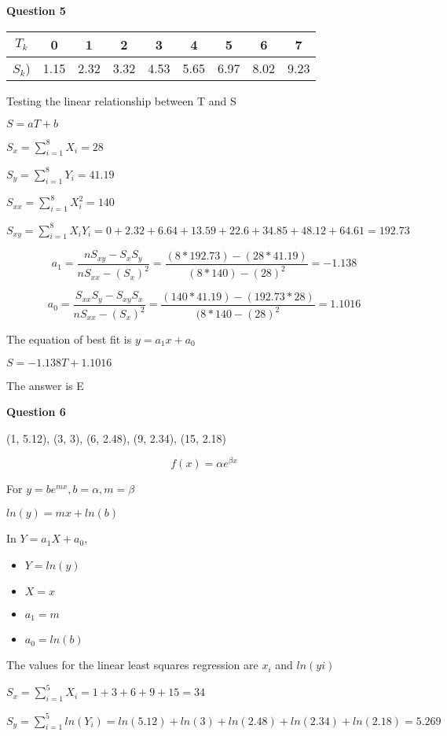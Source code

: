 \documentclass{article}
\begin{document}
\textbf{Question 5}


\begin{center}
\begin{tabular}{ |c|c|c|c|c|c|c|c|c| } 
 \hline
$T_k$ & 0 & 1 & 2 & 3 & 4 & 5 & 6 & 7\\
\hline
$S_k$)& 1.15 & 2.32 & 3.32 & 4.53 & 5.65 & 6.97 & 8.02 & 9.23\\
 \hline
\end{tabular}
\end{center}

Testing the linear relationship between T and S


$S = aT + b$


$S_x = \sum^{8}_{i=1}X_i = 28$


$S_y = \sum^{8}_{i=1}Y_i = 41.19$


$S_{xx} = \sum^{8}_{i=1}X_i^2 = 140$


$S_{xy} = \sum^{8}_{i=1}X_iY_i = 0 + 2.32 + 6.64 + 13.59 + 22.6 + 34.85 + 48.12 + 64.61 = 192.73$


\[a_1 = \frac{nS_{xy} - S_{x}S_y}{nS_{xx}-(S_x)^2} = \frac{(8 * 192.73) - (28*41.19)}{(8 * 140)-(28)^2} =  -1.138\]

\[a_0 = \frac{S_{xx}S_y - S_{xy}S_x}{nS_{xx}-(S_x)^2} = \frac{(140 * 41.19) - (192.73 * 28)}{(8 * 140-(28)^2} = 1.1016 \]

The equation of best fit is $ y = a_1x + a_0$

$S = -1.138T + 1.1016$

The answer is E


\textbf{Question 6}

(1, 5.12), (3, 3), (6, 2.48), (9, 2.34), (15, 2.18)

\[f(x) = \alpha e^{\beta x}\]

For $y = be^{mx}, b = \alpha, m = \beta$ 

$ln(y) = mx + ln(b)$

In $ Y = a_1X + a_0$,
\begin{itemize}
\item $ Y = ln(y)$
\item $X = x$
\item $a_1 = m$
\item $a_0 = ln(b)$
\end{itemize}

The values for the linear least squares regression are $x_i$ and $ln(yi)$


$S_x = \sum^{5}_{i=1}X_i = 1 + 3 + 6 + 9 + 15 = 34$


$S_y = \sum^{5}_{i=1}ln(Y_i) = ln(5.12) + ln(3) + ln(2.48) + ln(2.34) + ln(2.18) = 5.269 $
\end{document}
